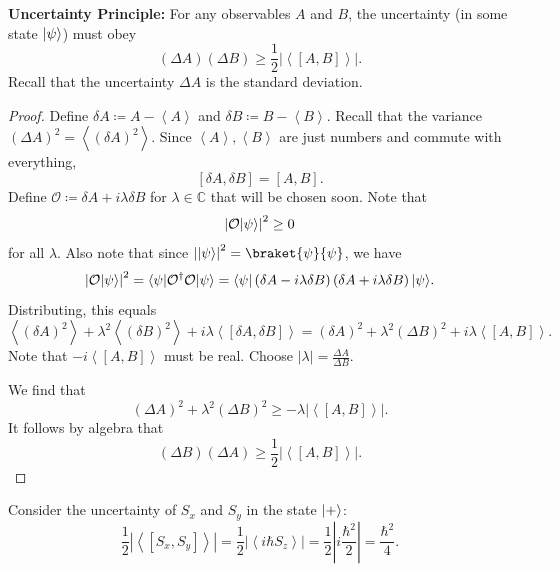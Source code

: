 \begin{mdframed}[linewidth=1pt]
	\textbf{Uncertainty Principle:} For any observables $A$ and $B$, the uncertainty (in some state $\lvert\psi \rangle$) must obey
	\[
		\left( \Delta A \right) \left( \Delta B \right) \geq \frac{1}{2} \left| \left\langle \left[ A,B \right]  \right\rangle  \right| 
	.\]
	Recall that the uncertainty $\Delta A$ is the standard deviation.
\end{mdframed}
\begin{proof}
	Define $\delta A\coloneqq A-\left\langle A \right\rangle $ and $\delta B\coloneqq B-\left\langle B \right\rangle $. Recall that the variance $\left( \Delta A \right)^2 =\left\langle \left( \delta A \right) ^2 \right\rangle $. Since $\left\langle A \right\rangle ,\left\langle B \right\rangle $ are just numbers and commute with everything,
	\[
		[\delta A,\delta B]=[A,B]
	.\]
	Define $\mathcal{O} \coloneqq \delta A+i\lambda \delta B$ for $\lambda \in\mathbb{C} $ that will be chosen soon. Note that
	\[
		\left| \mathcal{O} \lvert\psi \rangle  \right| ^2\geq 0
	\]
	for all $\lambda $. Also note that since $\left| \ket{\psi }  \right|^2 =\braket{\psi }{\psi } $, we have
	\[
		\left| \mathcal{O} \lvert\psi \rangle  \right| ^2 = \langle\psi \rvert  \mathcal{O} ^{\dagger} \mathcal{O} \lvert\psi \rangle =\langle\psi \rvert \left( \delta A-i\lambda \delta B \right) \left( \delta A+i\lambda \delta B \right) \lvert\psi \rangle 
	.\]
	Distributing, this equals
	\[
	\left\langle \left( \delta A \right) ^2 \right\rangle +\lambda ^2 \left\langle \left( \delta B \right) ^2 \right\rangle +i\lambda \left\langle\left[ \delta A,\delta B \right]\right\rangle=\left( \delta A \right)^2+\lambda ^2\left( \Delta B \right) ^2+i\lambda \left\langle[A,B]\right\rangle
	.\]
	Note that $-i \left\langle\left[ A,B \right]\right\rangle $ must be real. Choose $\left| \lambda  \right| =\frac{\Delta A}{\Delta B} $.

	We find that
	\[
		\left( \Delta A \right) ^2+\lambda ^2\left( \Delta B \right) ^2\geq -\lambda \left| \left\langle \left[ A,B \right]  \right\rangle  \right| 
	.\]
	It follows by algebra that
	\[
		\left( \Delta B \right) \left( \Delta A \right) \geq \frac{1}{2} \left| \left\langle \left[ A,B \right]  \right\rangle  \right| 
	.\]
\end{proof}

Consider the uncertainty of $S_x$ and $S_y$ in the state $\lvert+\rangle $:
\[
	\frac{1}{2} \left| \left\langle \left[ S_x,S_y \right]  \right\rangle  \right| =\frac{1}{2} \left| \left\langle i\hbar S_z \right\rangle  \right| =\frac{1}{2} \left| i\frac{\hbar ^2}{2}  \right| =\frac{\hbar ^2}{4} 
.\]
